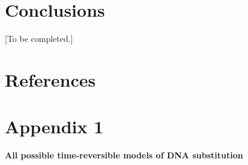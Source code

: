 \documentclass{svmult}
\begin{document}
\section{Conclusions}
\label{sec:4}

[To be completed.]


\section{References}

\newpage

\section*{Appendix 1}

{\bf All possible time-reversible models of DNA substitution}
\end{document}
